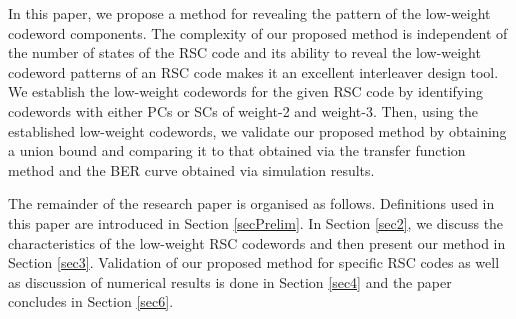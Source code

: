 In this paper, we propose a method for revealing the pattern of the low-weight codeword components. The complexity of our proposed method is independent of the number of states of the RSC code and its ability to reveal the low-weight codeword patterns of an RSC code makes it an excellent interleaver design tool.
We establish the low-weight codewords for the given RSC code by identifying codewords with either PCs or SCs of weight-2 and weight-3. Then, using the established low-weight codewords, we validate our proposed method by obtaining a union bound and comparing it to that obtained via the transfer function method and the BER curve obtained via simulation results.

The remainder of the research paper is organised as follows. Definitions used in this paper are introduced in Section \ref{secPrelim}. In Section \ref{sec2}, we discuss the characteristics of the low-weight RSC codewords and then present our method in Section \ref{sec3}. Validation of our proposed method for specific RSC codes as well as discussion of numerical results is done in Section \ref{sec4} and the paper concludes in Section \ref{sec6}.



